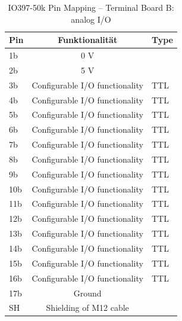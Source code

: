 \begin{table}[ht]
	\centering
	\caption{IO397-50k Pin Mapping – Terminal Board B: analog I/O \cite{speedgoat:IO397}}
	\label{speedgoat:IO397B}
	\begin{tabular}{lcl}
		\hline
		\textbf{Pin}             & \textbf{Funktionalität}        & \textbf{Type} \\ \hline
		\multicolumn{1}{l|}{1b}  & 0 V                            &               \\
		\multicolumn{1}{l|}{2b}  & 5 V                            &               \\\hline
		\multicolumn{1}{l|}{3b}  & Configurable I/O functionality & TTL           \\
		\multicolumn{1}{l|}{4b}  & Configurable I/O functionality & TTL           \\
		\multicolumn{1}{l|}{5b}  & Configurable I/O functionality & TTL           \\
		\multicolumn{1}{l|}{6b}  & Configurable I/O functionality & TTL           \\
		\multicolumn{1}{l|}{7b}  & Configurable I/O functionality & TTL           \\
		\multicolumn{1}{l|}{8b}  & Configurable I/O functionality & TTL           \\
		\multicolumn{1}{l|}{9b}  & Configurable I/O functionality & TTL           \\
		\multicolumn{1}{l|}{10b} & Configurable I/O functionality & TTL           \\
		\multicolumn{1}{l|}{11b} & Configurable I/O functionality & TTL           \\
		\multicolumn{1}{l|}{12b} & Configurable I/O functionality & TTL           \\
		\multicolumn{1}{l|}{13b} & Configurable I/O functionality & TTL           \\
		\multicolumn{1}{l|}{14b} & Configurable I/O functionality & TTL           \\
		\multicolumn{1}{l|}{15b} & Configurable I/O functionality & TTL           \\
		\multicolumn{1}{l|}{16b} & Configurable I/O functionality & TTL           \\\hline
		\multicolumn{1}{l|}{17b} & Ground                         &               \\
		\multicolumn{1}{l|}{SH}  & Shielding of M12 cable         &               \\ \hline
	\end{tabular}
\end{table}


